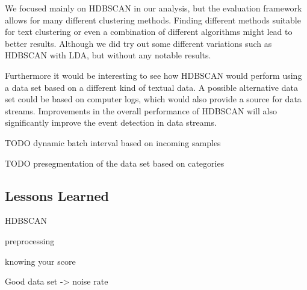 We focused mainly on HDBSCAN in our analysis, but the evaluation framework allows for many different clustering methods.
Finding different methods suitable for text clustering
or even a combination of different algorithms might lead to better results.
Although we did try out some different variations such as HDBSCAN with LDA,
but without any notable results.

Furthermore it would be interesting to see how HDBSCAN would perform
using a data set based on a different kind of textual data.
A possible alternative data set could be based on computer logs,
which would also provide a source for data streams.
Improvements in the overall performance of HDBSCAN will also significantly improve the event detection in data streams.


TODO dynamic batch interval based on incoming samples

TODO presegmentation of the data set based on categories


\subsection{Lessons Learned}
\label{subsec:6_lessons_learned}


HDBSCAN

preprocessing


knowing your score


Good data set -> noise rate
